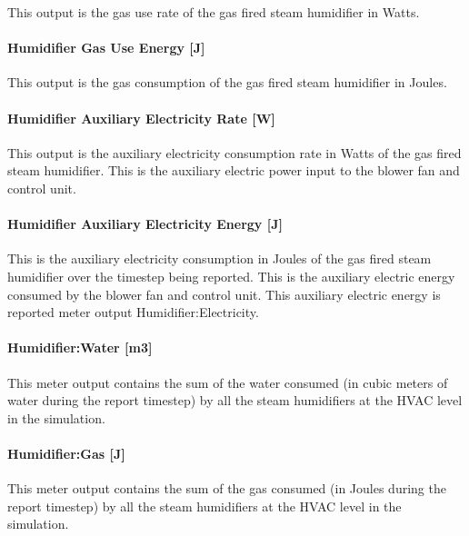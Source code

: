 This output is the gas use rate of the gas fired steam humidifier in Watts.

\paragraph{Humidifier Gas Use Energy {[}J{]}}\label{humidifier-gas-use-energy-j}

This output is the gas consumption of the gas fired steam humidifier in Joules.

\paragraph{Humidifier Auxiliary Electricity Rate {[}W{]}}\label{humidifier-auxiliary-electric-power-w}

This output is the auxiliary electricity consumption rate in Watts of the gas fired steam humidifier. This is the auxiliary electric power input to the blower fan and control unit.

\paragraph{Humidifier Auxiliary Electricity Energy {[}J{]}}\label{humidifier-auxiliary-electric-energy-j}

This is the auxiliary electricity consumption in Joules of the gas fired steam humidifier over the timestep being reported. This is the auxiliary electric energy consumed by the blower fan and control unit. This auxiliary electric energy is reported meter output Humidifier:Electricity.

\paragraph{Humidifier:Water {[}m3{]}}\label{humidifierwater-m3-1}

This meter output contains the sum of the water consumed (in cubic meters of water during the report timestep) by all the steam humidifiers at the HVAC level in the simulation.

\paragraph{Humidifier:Gas {[}J{]}}\label{humidifiergas-j}

This meter output contains the sum of the gas consumed (in Joules during the report timestep) by all the steam humidifiers at the HVAC level in the simulation.

